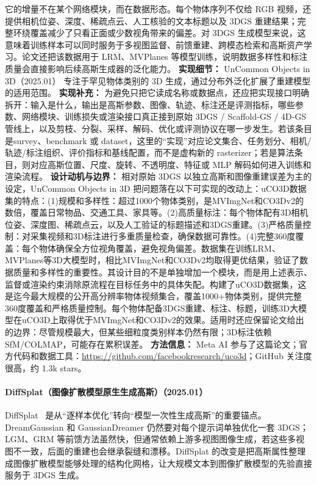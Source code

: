 它的增量不在某个网络模块，而在数据形态。每个物体序列不仅给 RGB 视频，还提供相机位姿、深度、稀疏点云、人工核验的文本标题以及 3DGS 重建结果；完整环绕覆盖减少了只看正面或少数视角带来的偏差。对 3DGS 生成模型来说，这意味着训练样本可以同时服务于多视图监督、前馈重建、跨模态检索和高斯资产学习。论文还把该数据用于 LRM、MVPlanes 等模型训练，说明数据多样性和标注质量会直接影响后续高斯生成器的泛化能力。
\textbf{实现细节：} UnCommon Objects in 3D（2025.01） 专注于罕见物体类别的 3D 生成，通过分布外泛化扩展了重建模型的适用范围。
\textbf{实现补充：} 为避免只把它读成名称或数据点，还应把实现接口明确拆开：输入是什么，输出是高斯参数、图像、轨迹、标注还是评测指标，哪些参数、网络模块、训练损失或渲染接口真正接到原始 3DGS / Scaffold-GS / 4D-GS 管线上，以及剪枝、分裂、采样、解码、优化或评测协议在哪一步发生。若该条目是survey、benchmark 或 dataset，这里的“实现”对应论文集合、任务划分、相机/轨迹/标注组织、评价指标和基线配置，而不是虚构新的 rasterizer；若是算法条目，则对应高斯位置、尺度、旋转、不透明度、特征或 MLP 解码如何进入训练和渲染流程。
\textbf{设计动机与边界：} 相对原始 3DGS 以独立高斯和图像重建误差为主的设定，UnCommon Objects in 3D 把问题落在以下可实现的改动上：uCO3D数据集的特点：(1)规模和多样性：超过1000个物体类别，是MVImgNet和CO3Dv2的数倍，覆盖日常物品、交通工具、家具等。(2)高质量标注：每个物体配有3D相机位姿、深度图、稀疏点云，以及人工验证的标题描述和3DGS重建。(3)严格质量控制：对采集视频和3D标注进行多重质量检查，确保数据可靠性。(4)完整360度覆盖：每个物体确保全方位视角覆盖，避免视角偏差。数据集在训练LRM、MVPlanes等3D大模型时，相比MVImgNet和CO3Dv2均取得更优结果，验证了数据质量和多样性的重要性。其设计目的不是单独增加一个模块，而是用上述表示、监督或渲染约束消除原流程在目标任务中的具体失配。构建了uCO3D数据集，这是迄今最大规模的公开高分辨率物体视频集合，覆盖1000+物体类别，提供完整360度覆盖和严格质量控制。每个物体配备3DGS重建、标注、标题，训练3D大模型在uCO3D上取得优于MVImgNet和CO3Dv2的效果。适用时还应保留论文给出的边界：尽管规模最大，但某些细粒度类别样本仍然有限；3D标注依赖SfM/COLMAP，可能存在累积误差。
\textbf{方法信息：} Meta AI 参与了这篇论文；官方代码和数据工具：\url{https://github.com/facebookresearch/uco3d}；GitHub 关注度很高，约 1.3k stars。
\paragraph{DiffSplat（图像扩散模型原生生成高斯）（2025.01）}
DiffSplat~\cite{2501_16764} 是从“逐样本优化”转向“模型一次性生成高斯”的重要锚点。DreamGaussian 和 GaussianDreamer 仍然要对每个提示词单独优化一套 3DGS；LGM、GRM 等前馈方法虽然快，但通常依赖上游多视图图像生成，若这些多视图不一致，后面的重建也会继承裂缝和漂移。DiffSplat 的改变是把高斯属性整理成图像扩散模型能够处理的结构化网格，让大规模文本到图像扩散模型的先验直接服务于 3DGS 生成。

